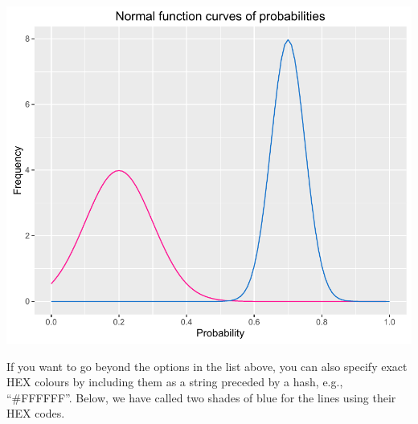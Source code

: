 \begin{Shaded}
\begin{Highlighting}[]
\StringTok{ }\NormalTok{(}\NormalTok{(} \NormalTok{(}\NormalTok{, }\NormalTok{)), }\NormalTok{(} 
\StringTok{    }\NormalTok{(}  \NormalTok{(}\NormalTok{, }\NormalTok{),}
       \NormalTok{) +}
\StringTok{    }\NormalTok{(}  \NormalTok{(}\NormalTok{, }\NormalTok{),}
       \NormalTok{) +}
\StringTok{    }\NormalTok{(} \NormalTok{,}
       \NormalTok{(}\NormalTok{, }\NormalTok{, }\NormalTok{), }\NormalTok{(}\NormalTok{, }\NormalTok{)) +}
\StringTok{    }\NormalTok{(} \NormalTok{) +}
\StringTok{    }\NormalTok{(}\NormalTok{)}
\end{Highlighting}
\end{Shaded}

\begin{center}\includegraphics[width=0.6\linewidth]{9_Function_Plots_pdf/function_8-1} \end{center}

If you want to go beyond the options in the list above, you can also
specify exact HEX colours by including them as a string preceded by a
hash, e.g., ``\#FFFFFF''. Below, we have called two shades of blue for
the lines using their HEX codes.


